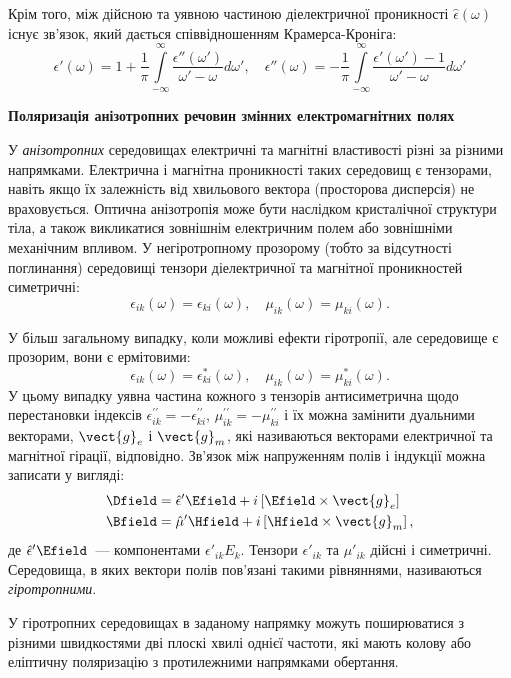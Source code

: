 \begin{Theory}
	Крім того, між дійсною та уявною частиною діелектричної проникності $\hat\epsilon(\omega)$ існує зв'язок, який дається співвідношенням Крамерса-Кроніга:
	\begin{equation}\label{eq:Kramers-Kronig}
		\epsilon'(\omega) = 1 + \frac1\pi \int\limits_{- \infty }^{\infty}\frac{\epsilon''(\omega')}{\omega'-\omega}d\omega',  \quad
		\epsilon''(\omega) = - \frac1\pi \int\limits_{- \infty }^{\infty}\frac{\epsilon'(\omega') - 1}{\omega'-\omega}d\omega'
	\end{equation}

	\textbf{Поляризація анізотропних речовин змінних електромагнітних полях}

	У \emph{анізотропних} середовищах електричні та магнітні властивості різні за різними напрямками. Електрична і магнітна проникності таких середовищ є тензорами, навіть якщо їх залежність від хвильового вектора (просторова дисперсія) не враховується. Оптична анізотропія може бути наслідком кристалічної структури тіла, а також викликатися зовнішнім електричним полем або зовнішніми механічним впливом. У негіротропному прозорому (тобто за відсутності поглинання) середовищі тензори діелектричної та магнітної проникностей симетричні:
	\begin{equation}\label{eq:symm_e_m}
		\epsilon_{ik}(\omega) = \epsilon_{ki}(\omega), \quad \mu_{ik}(\omega) = \mu_{ki}(\omega).
	\end{equation}

	У більш загальному випадку, коли можливі ефекти гіротропії, але середовище є прозорим, вони є ермітовими:
	\begin{equation}\label{eq:symm_e_m}
		\epsilon_{ik}(\omega) = \epsilon_{ki}^*(\omega), \quad \mu_{ik}(\omega) = \mu_{ki}^*(\omega).
	\end{equation}
	У цьому випадку уявна частина кожного з тензорів антисиметрична щодо перестановки індексів $\epsilon^{\prime\prime}_{ik} = -\epsilon^{\prime\prime}_{ki}$, $\mu^{\prime\prime}_{ik} = -\mu^{\prime\prime}_{ki}$  і їх можна замінити дуальними векторами, $\vect{g}_e$ і $\vect{g}_m$, які називаються векторами електричної та магнітної гірації, відповідно.  Зв'язок між напруженням полів і індукції можна записати у вигляді:
	\begin{align}
		\Dfield & = \hat{\epsilon}' \Efield + i\left[ \Efield\times\vect{g}_e\right] \\
		\Bfield & = \hat{\mu}' \Hfield + i\left[ \Hfield\times\vect{g}_m\right] ,
	\end{align}
	де $\hat{\epsilon}' \Efield$~--- компонентами $\epsilon'_{ik}E_k $. Тензори $\epsilon'_{ik}$ та $\mu'_{ik}$ дійсні і симетричні. Середовища, в яких вектори полів пов'язані такими рівняннями, називаються \emph{гіротропними}.

	У гіротропних середовищах в заданому напрямку можуть поширюватися з різними швидкостями дві плоскі хвилі однієї частоти, які мають  колову або еліптичну поляризацію з протилежними напрямками обертання.
\end{Theory}
